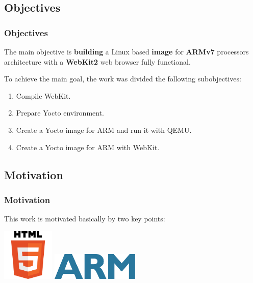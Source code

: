 \documentclass[slidestop,compress,mathserif]{beamer}
\begin{document}
\subsection{Objectives}
\begin{frame}
  \frametitle{Objectives}

  The main objective is \textbf{building} a Linux based \textbf{image} for \textbf{ARMv7} processors architecture with a \textbf{WebKit2} web browser fully functional.
  
  To achieve the main goal, the work was divided the following subobjectives:

  \vspace{5mm}

  \begin{enumerate}
    \item<2-> Compile WebKit.
    \item<3-> Prepare Yocto environment.
    \item<4-> Create a Yocto image for ARM and run it with QEMU.
    \item<5-> Create a Yocto image for ARM with WebKit.
  \end{enumerate}

\end{frame}

\subsection{Motivation}
\begin{frame}
  \frametitle{Motivation}

  This work is motivated basically by two key points:
  \pause

  \vspace{10mm}
  \begin{center}
    \includegraphics[height=2.5cm]{images/HTML5-logo.png}
    \hspace{10mm}
    \pause
    \href{http://financialreports.arm.com/downloads/pdfs/ARM_AR11_Our_Story_v1.pdf}{\includegraphics[height=1.3cm]{images/ARM-logo.png}}
    
    \pause
  \end{center}

\end{frame}
\end{document}
